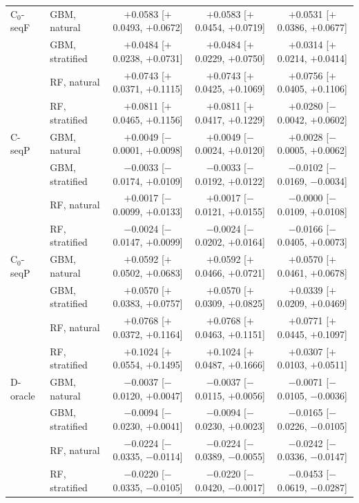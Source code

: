 \begin{longtable}{llccc}
\addlinespace
C$_0$-seqF & GBM, natural & $+$0.0583 [$+$0.0493, $+$0.0672] & $+$0.0583 [$+$0.0454, $+$0.0719] & $+$0.0531 [$+$0.0386, $+$0.0677] \\
 & GBM, stratified & $+$0.0484 [$+$0.0238, $+$0.0731] & $+$0.0484 [$+$0.0229, $+$0.0750] & $+$0.0314 [$+$0.0214, $+$0.0414] \\
 & RF, natural & $+$0.0743 [$+$0.0371, $+$0.1115] & $+$0.0743 [$+$0.0425, $+$0.1069] & $+$0.0756 [$+$0.0405, $+$0.1106] \\
 & RF, stratified & $+$0.0811 [$+$0.0465, $+$0.1156] & $+$0.0811 [$+$0.0417, $+$0.1229] & $+$0.0280 [$-$0.0042, $+$0.0602] \\
\addlinespace
C-seqP & GBM, natural & $+$0.0049 [$-$0.0001, $+$0.0098] & $+$0.0049 [$-$0.0024, $+$0.0120] & $+$0.0028 [$-$0.0005, $+$0.0062] \\
 & GBM, stratified & $-$0.0033 [$-$0.0174, $+$0.0109] & $-$0.0033 [$-$0.0192, $+$0.0122] & $-$0.0102 [$-$0.0169, $-$0.0034] \\
 & RF, natural & $+$0.0017 [$-$0.0099, $+$0.0133] & $+$0.0017 [$-$0.0121, $+$0.0155] & $-$0.0000 [$-$0.0109, $+$0.0108] \\
 & RF, stratified & $-$0.0024 [$-$0.0147, $+$0.0099] & $-$0.0024 [$-$0.0202, $+$0.0164] & $-$0.0166 [$-$0.0405, $+$0.0073] \\
\addlinespace
C$_0$-seqP & GBM, natural & $+$0.0592 [$+$0.0502, $+$0.0683] & $+$0.0592 [$+$0.0466, $+$0.0721] & $+$0.0570 [$+$0.0461, $+$0.0678] \\
 & GBM, stratified & $+$0.0570 [$+$0.0383, $+$0.0757] & $+$0.0570 [$+$0.0309, $+$0.0825] & $+$0.0339 [$+$0.0209, $+$0.0469] \\
 & RF, natural & $+$0.0768 [$+$0.0372, $+$0.1164] & $+$0.0768 [$+$0.0463, $+$0.1151] & $+$0.0771 [$+$0.0445, $+$0.1097] \\
 & RF, stratified & $+$0.1024 [$+$0.0554, $+$0.1495] & $+$0.1024 [$+$0.0487, $+$0.1666] & $+$0.0307 [$+$0.0103, $+$0.0511] \\
\addlinespace
D-oracle & GBM, natural & $-$0.0037 [$-$0.0120, $+$0.0047] & $-$0.0037 [$-$0.0115, $+$0.0056] & $-$0.0071 [$-$0.0105, $-$0.0036] \\
 & GBM, stratified & $-$0.0094 [$-$0.0230, $+$0.0041] & $-$0.0094 [$-$0.0230, $+$0.0023] & $-$0.0165 [$-$0.0226, $-$0.0105] \\
 & RF, natural & $-$0.0224 [$-$0.0335, $-$0.0114] & $-$0.0224 [$-$0.0389, $-$0.0055] & $-$0.0242 [$-$0.0336, $-$0.0147] \\
 & RF, stratified & $-$0.0220 [$-$0.0335, $-$0.0105] & $-$0.0220 [$-$0.0420, $-$0.0017] & $-$0.0453 [$-$0.0619, $-$0.0287] \\

\end{longtable}
